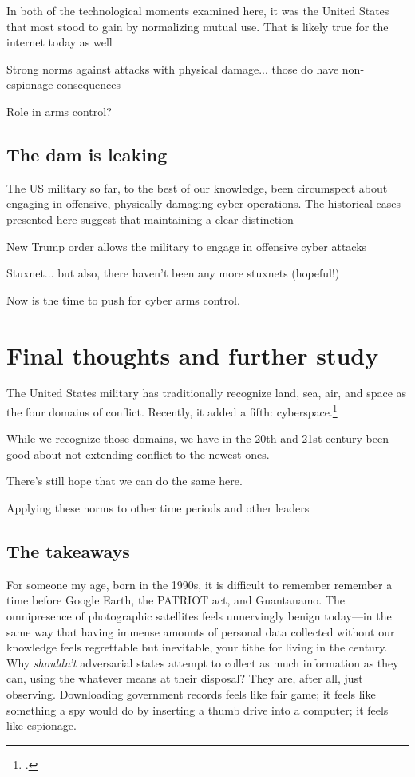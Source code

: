 \documentclass{memoir}
\begin{document}
In both of the technological moments examined here, it was the United States that most stood to gain by normalizing mutual use. That is likely true for the internet today as well

Strong norms against attacks with physical damage... those do have non-espionage consequences

Role in arms control?

\subsection{The dam is leaking}
The US military so far, to the best of our knowledge, been circumspect about engaging in offensive, physically damaging cyber-operations. The historical cases presented here suggest that maintaining a clear distinction

New Trump order allows the military to engage in offensive cyber attacks

Stuxnet... but also, there haven't been any more stuxnets (hopeful!)

Now is the time to push for cyber arms control.

\section{Final thoughts and further study}
The United States military has traditionally recognize land, sea, air, and space as the four domains of conflict. Recently, it added a fifth: cyberspace.\footcite{carafano_americas_2018}

While we recognize those domains, we have in the 20th and 21st century been good about not extending conflict to the newest ones.

There's still hope that we can do the same here.


Applying these norms to other time periods and other leaders

\subsection{The takeaways}

For someone my age, born in the 1990s, it is difficult to remember remember a time before Google Earth, the PATRIOT act, and Guantanamo. The omnipresence of photographic satellites feels unnervingly benign today---in the same way that having immense amounts of personal data collected without our knowledge feels regrettable but inevitable, your tithe for living in the  century. Why \emph{shouldn't} adversarial states attempt to collect as much information as they can, using the whatever means at their disposal? They are, after all, just observing. Downloading government records feels like fair game; it feels like something a spy would do by inserting a thumb drive into a computer; it feels like espionage.
\end{document}
